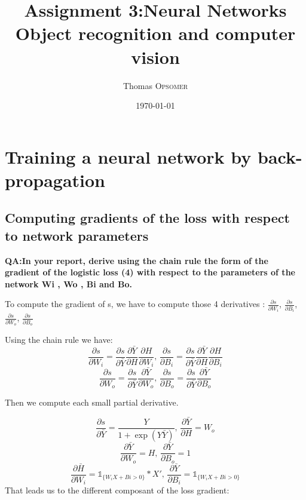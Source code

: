 \documentclass[a4paper,11pt]{exam}
\title{Assignment 3:Neural Networks \\ Object recognition and computer vision} %
\author{Thomas \textsc{Opsomer}} %
\date{\today} %
\begin{document}
\maketitle %




\section{Training a neural network by back-propagation}

\subsection{Computing gradients of the loss with respect to network parameters}

\textbf{QA:In your report, derive using the chain rule the form of the gradient of the logistic loss (4) with respect to the parameters of the network Wi , Wo , Bi and Bo.\\}

To compute the gradient of s, we have to compute those 4 derivatives :
$\frac{\partial s}{\partial W_i}$,
$\frac{\partial s}{\partial B_i}$,
$\frac{\partial s}{\partial W_o}$,
$\frac{\partial s}{\partial B_o}$

Using the chain rule we have:
\[
\frac{\partial s}{\partial W_i}
   = \frac{\partial s}{\partial \bar{Y}} \frac{\partial \bar{Y}}{\partial H} \frac{\partial H}{\partial W_i}
\text{, }
\frac{\partial s}{\partial B_i}
   = \frac{\partial s}{\partial \bar{Y}} \frac{\partial \bar{Y}}{\partial H} \frac{\partial H}{\partial B_i}
\]
\[
\frac{\partial s}{\partial W_o}
   = \frac{\partial s}{\partial \bar{Y}} \frac{\partial \bar{Y}}{\partial W_o}
\text{, }
\frac{\partial s}{\partial B_o}
   = \frac{\partial s}{\partial \bar{Y}} \frac{\partial \bar{Y}}{\partial B_o}
\]

Then we compute each small partial derivative.

\[
\frac{\partial s}{\partial \bar{Y}}
   = \frac{Y}{1 + \exp(Y\bar{Y})}
\text{, }
\frac{\partial \bar{Y}}{\partial H}
   = W_o
\]
\[
\frac{\partial \bar{Y}}{\partial W_o}
   = H
\text{, } 
\frac{\partial \bar{Y}}{\partial B_o}
   = 1
\]
\[
\frac{\partial \bar{H}}{\partial W_i}
   = \mathbb 1_{\{W_iX + Bi > 0\}} * X'
\text{, } 
\frac{\partial \bar{Y}}{\partial B_i}
   = \mathbb 1_{\{W_iX + Bi > 0\}}
\]
That leads us to the different composant of the loss gradient:
\end{document}
